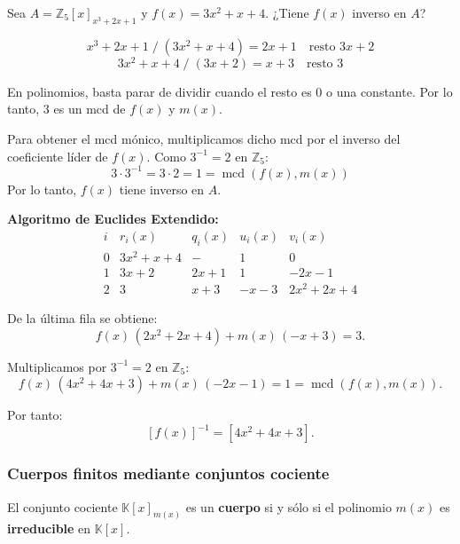 \documentclass[a4paper,12pt]{article}
\begin{document}
\begin{ejemplo}
Sea \(A = \mathbb{Z}_5[x]_{x^3+2x+1}\) y \(f(x) = 3x^2 + x + 4\).  
¿Tiene \(f(x)\) inverso en \(A\)?

\[
x^3 + 2x + 1 \;/\; (3x^2 + x + 4) = 2x + 1 \quad \text{resto } 3x + 2
\]
\[
3x^2 + x + 4 \;/\; (3x + 2) = x + 3 \quad \text{resto } \boxed{3}
\]

En polinomios, basta parar de dividir cuando el resto es 0 o una constante.  
Por lo tanto, \(3\) es un mcd de \(f(x)\) y \(m(x)\).

Para obtener el mcd mónico, multiplicamos dicho mcd por el inverso del coeficiente líder de \(f(x)\).  
Como \(3^{-1} = 2\) en \(\mathbb{Z}_5\):
\[
3 \cdot 3^{-1} = 3 \cdot 2 = 1 = \operatorname{mcd}(f(x), m(x))
\]
Por lo tanto, \(f(x)\) tiene inverso en \(A\).

\vspace{0.5em}
\noindent\textbf{Algoritmo de Euclides Extendido:}
\[
\begin{array}{c|c|c|c|c}
i & r_i(x) & q_i(x) & u_i(x) & v_i(x) \\ \hline
0 & 3x^2 + x + 4 & - & 1 & 0 \\[4pt]
1 & 3x + 2 & 2x + 1 & 1 & -2x-1 \\[4pt]
2 & \boxed{3} & x + 3 & -x - 3 & 2x^2 + 2x + 4
\end{array}
\]

De la última fila se obtiene:
\[
f(x)\,(2x^2 + 2x + 4) + m(x)\,(-x + 3) = \boxed{3}.
\]

Multiplicamos por \(3^{-1} = 2\) en \(\mathbb{Z}_5\):
\[
f(x)\,(4x^2 + 4x + 3) + m(x)\,(-2x - 1) = 1 = \operatorname{mcd}(f(x), m(x)).
\]

Por tanto:
\[
[f(x)]^{-1} = [4x^2 + 4x + 3].
\]
\end{ejemplo}

\subsubsection{Cuerpos finitos mediante conjuntos cociente}

\begin{procedimiento}[title=Determinación de cuándo \(\mathbb{K}\) es un cuerpo]
El conjunto cociente \(\mathbb{K}[x]_{m(x)}\) es un \textbf{cuerpo} si y sólo si el polinomio \(m(x)\) es \textbf{irreducible} en \(\mathbb{K}[x]\).

\end{procedimiento}
\end{document}
